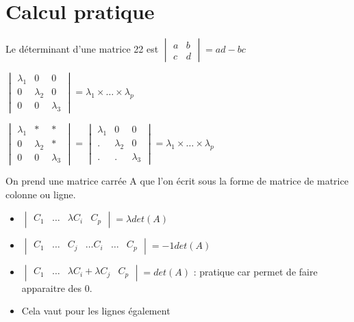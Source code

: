 \documentclass[french]{yLectureNote}
\begin{document}
\section{Calcul pratique}
\begin{proposition}
Le déterminant d'une matrice 22  est \(\begin{vmatrix}
a&b\\
c&d
                \end{vmatrix} = ad-bc\)
\end{proposition}
\begin{proposition}
\(\begin{vmatrix}
\lambda_1&0&0\\
0&\lambda_2&0\\
0&0&\lambda_3
                \end{vmatrix} = \lambda_1\times\dots\times \lambda_p\)
\end{proposition}
\begin{proposition}
\(\begin{vmatrix}
\lambda_1&*&*\\
0&\lambda_2&*\\
0&0&\lambda_3
                \end{vmatrix} =\begin{vmatrix}
\lambda_1&0&0\\
.&\lambda_2&0\\
.&.&\lambda_3
                \end{vmatrix} = \lambda_1\times\dots\times \lambda_p\)
\end{proposition}
\begin{proposition}
On prend une matrice carrée A que l'on écrit sous la forme  de matrice de matrice colonne ou ligne.

\begin{itemize}
 \item \(\begin{vmatrix}
        C_1&\dots&\lambda C_i&C_p
       \end{vmatrix} = \lambda det(A)\)
\item \(\begin{vmatrix}
        C_1&\dots& C_j&\dots C_i &\dots &C_p
       \end{vmatrix} = -1 det(A)\)
\item \(\begin{vmatrix}
        C_1&\dots&\lambda C_i+\lambda C_j&C_p
       \end{vmatrix} = det(A)\) : pratique car permet de faire apparaitre des 0.
\item Cela vaut pour les lignes également
\end{itemize}

\end{proposition}
\end{document}
